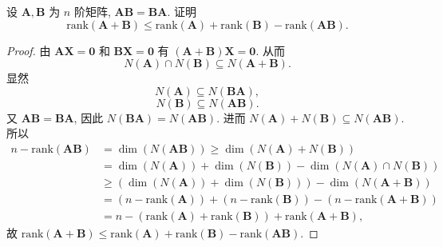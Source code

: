 \documentclass[../../main.tex]{subfiles}
\begin{document}
\begin{example}
设 $\boldsymbol{A},\boldsymbol{B}$ 为 $n$ 阶矩阵, $\boldsymbol{AB} = \boldsymbol{BA}$. 证明
\[
\mathrm{rank}(\boldsymbol{A} + \boldsymbol{B}) \leqslant \mathrm{rank}(\boldsymbol{A}) + \mathrm{rank}(\boldsymbol{B}) - \mathrm{rank}(\boldsymbol{AB}).
\]
\end{example}
\begin{proof}
由 $\boldsymbol{A}\boldsymbol{X} = \boldsymbol{0}$ 和 $\boldsymbol{B}\boldsymbol{X} = \boldsymbol{0}$ 有 $(\boldsymbol{A} + \boldsymbol{B})\boldsymbol{X} = \boldsymbol{0}$. 从而
\[
N(\boldsymbol{A}) \cap N(\boldsymbol{B}) \subseteq N(\boldsymbol{A} + \boldsymbol{B}).
\]
显然
\[
N(\boldsymbol{A}) \subseteq N(\boldsymbol{BA}),
\]
\[
N(\boldsymbol{B}) \subseteq N(\boldsymbol{AB}).
\]
又 $\boldsymbol{AB} = \boldsymbol{BA}$, 因此 $N(\boldsymbol{BA}) = N(\boldsymbol{AB})$. 进而 $N(\boldsymbol{A}) + N(\boldsymbol{B}) \subseteq N(\boldsymbol{AB})$. 所以
\begin{align*}
n - \mathrm{rank}(\boldsymbol{AB}) &= \dim (N(\boldsymbol{AB})) \geqslant \dim (N(\boldsymbol{A}) + N(\boldsymbol{B})) \\
&= \dim (N(\boldsymbol{A})) + \dim (N(\boldsymbol{B})) - \dim (N(\boldsymbol{A}) \cap N(\boldsymbol{B})) \\
&\geqslant (\dim (N(\boldsymbol{A})) + \dim (N(\boldsymbol{B}))) - \dim (N(\boldsymbol{A} + \boldsymbol{B})) \\
&= (n - \mathrm{rank}(\boldsymbol{A})) + (n - \mathrm{rank}(\boldsymbol{B})) - (n - \mathrm{rank}(\boldsymbol{A} + \boldsymbol{B})) \\
&= n - (\mathrm{rank}(\boldsymbol{A}) + \mathrm{rank}(\boldsymbol{B})) + \mathrm{rank}(\boldsymbol{A} + \boldsymbol{B}),
\end{align*}
故 $\mathrm{rank}(\boldsymbol{A} + \boldsymbol{B}) \leqslant \mathrm{rank}(\boldsymbol{A}) + \mathrm{rank}(\boldsymbol{B}) - \mathrm{rank}(\boldsymbol{AB})$.

\end{proof}
\end{document}
